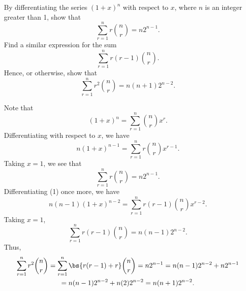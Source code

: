 \begin{problem}
    By differentiating the series $(1 + x)^n$ with respect to $x$, where $n$ is an integer greater than 1, show that \[\sum_{r = 1}^n r \binom{n}{r} = n 2^{n-1}.\] Find a similar expression for the sum \[\sum_{r = 1}^n r(r-1) \binom{n}{r}.\] Hence, or otherwise, show that \[\sum_{r = 1}^n r^2 \binom{n}{r} = n(n+1) 2^{n-2}.\]
\end{problem}
\begin{solution}
    Note that \[(1 + x)^n = \sum_{r = 1}^n \binom{n}{r} x^r.\] Differentiating with respect to $x$, we have \[n (1 + x)^{n-1} = \sum_{r = 1}^n r \binom{n}{r} x^{r-1}. \tag{1}\] Taking $x = 1$, we see that \[\sum_{r = 1}^n r \binom{n}{r} = n 2^{n-1}.\] Differentiating (1) once more, we have \[n(n-1) (1 + x)^{n-2} = \sum_{r = 1}^n r(r-1) \binom{n}{r} x^{r-2}.\] Taking $x = 1$, \[\sum_{r = 1}^n r(r-1) \binom{n}{r} = n(n-1) 2^{n-2}.\] Thus,
    \begin{gather*}
        \sum_{r = 1}^n r^2 \binom{n}{r} = \sum_{r = 1}^n \bs{r(r-1) + r} \binom{n}{r} = n 2^{n-1} = n(n-1) 2^{n-2} + n 2^{n-1}\\
        = n(n-1)2^{n-2} + n(2)2^{n-2} = n(n+1) 2^{n-2}.
    \end{gather*}
\end{solution}